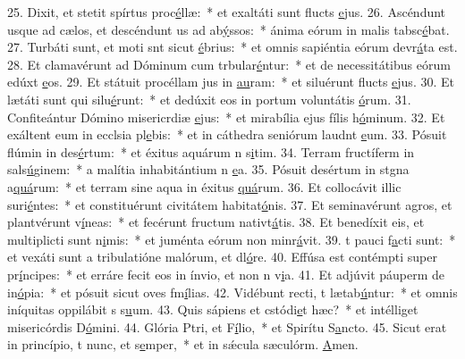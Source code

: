 25. Dixit, et stetit spírtus proc\uline{é}llæ:~* et exaltáti sunt flucts \uline{e}jus.
26. Ascéndunt usque ad cælos, et descéndunt us ad ab\uline{ý}ssos:~* ánima eórum in malis tabsc\uline{é}bat.
27. Turbáti sunt, et moti snt sicut \uline{é}brius:~* et omnis sapiéntia eórum devr\uline{á}ta est.
28. Et clamavérunt ad Dóminum cum trbular\uline{é}ntur:~* et de necessitátibus eórum edúxt \uline{e}os.
29. Et státuit procéllam jus in \uline{au}ram:~* et siluérunt flucts \uline{e}jus.
30. Et lætáti sunt qui silu\uline{é}runt:~* et dedúxit eos in portum voluntátis \uline{ó}rum.
31. Confiteántur Dómino misericrdiæ \uline{e}jus:~* et mirabília ejus fílis h\uline{ó}minum.
32. Et exáltent eum in ecclsia pl\uline{e}bis:~* et in cáthedra seniórum laudnt \uline{e}um.
33. Pósuit flúmin in des\uline{é}rtum:~* et éxitus aquárum n s\uline{i}tim.
34. Terram fructíferm in sals\uline{ú}ginem:~* a malítia inhabitántium n \uline{e}a.
35. Pósuit desértum in stgna a\uline{quá}rum:~* et terram sine aqua in éxitus \uline{quá}rum.
36. Et collocávit illic suri\uline{é}ntes:~* et constituérunt civitátem habitat\uline{ó}nis.
37. Et seminavérunt agros, et plantvérunt v\uline{í}neas:~* et fecérunt fructum nativt\uline{á}tis.
38. Et benedíxit eis, et multiplicti sunt n\uline{i}mis:~* et juménta eórum non minr\uline{á}vit.
39. t pauci f\uline{a}cti sunt:~* et vexáti sunt a tribulatióne malórum, et dl\uline{ó}re.
40. Effúsa est contémpti super pr\uline{í}ncipes:~* et erráre fecit eos in ínvio, et non n v\uline{i}a.
41. Et adjúvit páuperm de in\uline{ó}pia:~* et pósuit sicut oves fm\uline{í}lias.
42. Vidébunt recti, t lætab\uline{ú}ntur:~* et omnis iníquitas oppilábit s s\uline{u}um.
43. Quis sápiens et cstódi\uline{e}t hæc?~* et intélliget misericórdis D\uline{ó}mini.
44. Glória Ptri, et F\uline{í}lio,~* et Spirítu S\uline{a}ncto.
45. Sicut erat in princípio, t nunc, et s\uline{e}mper,~* et in sǽcula sæculórm. \uline{A}men.
